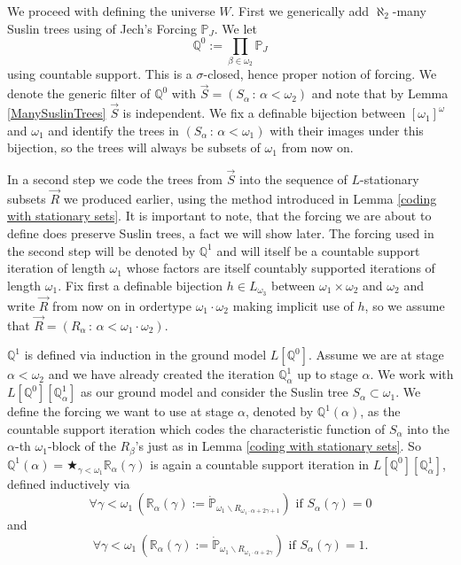 \documentclass[a4paper,12pt]{article}
\newcommand{\forceP}{\mathbb{P}}
\newcommand{\forceQ}{\mathbb{Q}}
\newcommand{\forceR}{\mathbb{R}}
\begin{document}
We proceed with defining the universe $W$.
First we generically add $\aleph_2$-many Suslin trees using of Jech's Forcing $ \forceP_J$. We let 
\[\forceQ^0 := \prod_{\beta \in \omega_2} \forceP_J \] using countable support. This is a $\sigma$-closed, hence proper notion of forcing. We denote the generic filter of $\forceQ^0$ with $\vec{S}=(S_{\alpha} \, : \, \alpha < \omega_2)$ and note that by Lemma \ref{ManySuslinTrees} $\vec{S}$ is independent.  We fix a definable bijection between $[\omega_1]^{\omega}$ and $\omega_1$ and identify the trees in $(S_{\alpha }\, : \, \alpha < \omega_1)$ with their images under this bijection, so the trees will always be subsets of $\omega_1$ from now on. 


In a second step we code the trees from $\vec{S}$ into the sequence of $L$-stationary subsets $\vec{R}$ we produced earlier, using the method introduced in Lemma \ref{coding with stationary sets}. It is important to note, that the forcing we are about to define does preserve Suslin trees, a fact we will show later.
The forcing used in the second step will be denoted by $\mathbb{Q}^1$ and will itself be a countable support iteration of length $\omega_1$ whose factors are itself countably supported iterations of length $\omega_1$. Fix first a definable bijection $h \in L_{\omega_3}$ between $\omega_1 \times \omega_2$ and $\omega_2$ and write $\vec{R}$ from now on in ordertype $\omega_1 \cdot \omega_2$ making implicit use of $h$, so we assume that $\vec{R}= (R_{\alpha} \, : \, \alpha < \omega_1 \cdot \omega_2)$. 

$\forceQ^1$ is defined via induction in the ground model $L[\forceQ^0]$. Assume we are at stage $\alpha < \omega_2$ and we have already created the iteration $\forceQ^1_{\alpha}$ up to stage $\alpha$. We work with $L[\forceQ^0][\forceQ^1_{\alpha}]$ as our ground model
 and consider the Suslin tree $S_{\alpha} \subset \omega_1$. 
 We define the forcing we want to use at stage $\alpha$, denoted by $\forceQ^1 (\alpha)$, as the countable support iteration which codes the characteristic function of $S_{\alpha}$ into the $\alpha$-th $\omega_1$-block of the $R_{\beta}$'s just as in Lemma \ref{coding with stationary sets}. So $\forceQ^1 (\alpha)= \bigstar_{\gamma < \omega_1} \forceR_{\alpha}(\gamma)$ is again a countable support iteration in $L[\forceQ^0][\forceQ^1_{\alpha}]$, defined inductively via
\[ \forall \gamma < \omega_1 \,(\forceR_{\alpha}(\gamma):= \dot{\forceP}_{\omega_1 \backslash R_{\omega_1 \cdot \alpha + 2 \gamma +1}}) \text{ if } S_{\alpha} (\gamma) =0 \]
and
\[ \forall \gamma < \omega_1 \, (\forceR_{\alpha}(\gamma):= \dot{\forceP}_{\omega_1 \backslash R_{\omega_1 \cdot \alpha + 2 \gamma}}) \text{ if } S_{\alpha} (\gamma) =1. \]
\end{document}
